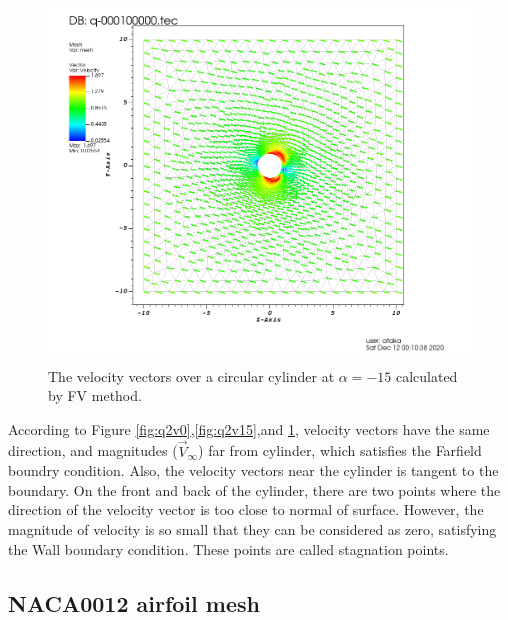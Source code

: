 \documentclass[letterpaper,12pt]{article}
\begin{document}
\begin{figure} [ht]
	\centering
	\includegraphics[height = 9.5cm]{graph/neg15deg/Cylinder_neg15angle_vector0000.png}
	\caption{The velocity vectors over a circular cylinder at $\alpha=-15$ calculated by FV method.}
    \label{fig:q2v-15}
\end{figure}

\vspace{1cm}

According to Figure \ref{fig:q2v0},\ref{fig:q2v15},and \ref{fig:q2v-15}, velocity vectors have the 
same direction, and magnitudes ($\vec{V}_{\infty}$) far from cylinder, which satisfies the Farfield boundry condition.
Also, the velocity vectors near the cylinder is tangent to the boundary. On the front and back of the 
cylinder, there are two points where the direction of the velocity vector is too close to normal
of surface. However, the magnitude of velocity is so small that they can be considered as zero,
satisfying the Wall boundary condition. These points are called stagnation points.

\newpage

\subsection{NACA0012 airfoil mesh}
\label{sec:medium}
\end{document}
